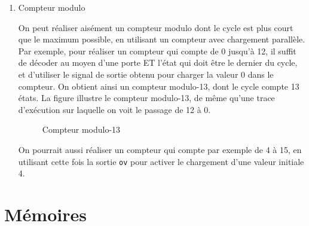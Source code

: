 \documentclass[letter, oneside]{book}
\begin{document}
\begin{enumerate}
La trace d'exécution de la figure \ref{fig:orga550827}
montre le comptage de 4 jusqu'à 15 et retour à 0. On voit le signal
\texttt{ov} s'activer sur 15. 

\begin{figure}[htbp]
\centering

\caption{\label{fig:org4873c36}Compteur à chargement parallèle}
\end{figure}

\begin{figure}[htbp]
\centering

\caption{\label{fig:orga550827}Trace d'exécution, de 0 à 15}
\end{figure}

La trace de la figure suivante montre le compteur qui
passe de 0 à 5, puis un chargement parallèle de la valeur 12.

\begin{figure}[htbp]
\centering

\caption{\label{fig:org1acfceb}Trace d'exécution, de 0 à 5 et chargement de 12}
\end{figure}

\item Compteur modulo
\label{sec:org8210fd0}

On peut réaliser aisément un compteur modulo dont le cycle est plus
court que le maximum possible, en utilisant un compteur avec
chargement parallèle.  Par exemple, pour réaliser un compteur qui
compte de 0 jusqu'à 12, il suffit de décoder au moyen d'une porte ET
l'état qui doit être le dernier du cycle, et d'utiliser le signal de
sortie obtenu pour charger la valeur 0 dans le compteur. On obtient
ainsi un compteur modulo-13, dont le cycle compte 13 états.  La figure
illustre le compteur modulo-13, de même qu'une trace d'exécution sur
laquelle on voit le passage de 12 à 0.

\begin{figure}[htbp]
\centering

\caption{\label{fig:orge96b7aa}Compteur modulo-13}
\end{figure}

On pourrait aussi réaliser un compteur qui compte par exemple de 4 à
15, en utilisant cette fois la sortie \texttt{ov} pour activer le chargement
d'une valeur initiale 4.
\end{enumerate}

\chapter{Mémoires}
\label{sec:org9bddc0f}
\end{document}
